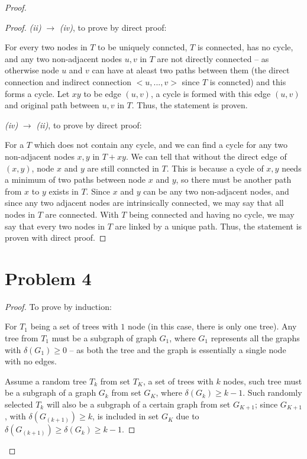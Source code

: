 \documentclass[12pt]{article}
\begin{document}
\begin{proof}
\begin{proof}
\textit{(ii)} $\longrightarrow$ \textit{(iv)}, to prove by direct proof:


For every two nodes in $T$ to be uniquely conncted, $T$ is connected, has no cycle, and any two non-adjacent nodes $u, v$ in $T$ are not directly connected -- as otherwise node $u$ and $v$ can have at aleast two paths between them (the direct connection and indirect connection $<u, ..., v>$ since $T$ is conncted) and this forms a cycle. Let $xy$ to be edge $(u, v)$, a cycle is formed with this edge $(u, v)$ and original path between $u, v$ in $T$. Thus, the statement is proven. \newline


\textit{(iv)} $\longrightarrow$ \textit{(ii)}, to prove by direct proof:

For a $T$ which does not contain any cycle, and we can find a cycle for any two non-adjacent nodes $x, y$ in $T+xy$. We can tell that without the direct edge of $(x,y)$, node $x$ and $y$ are still conncted in $T$. This is because a cycle of $x, y$ needs a minimum of two paths between node $x$ and $y$, so there must be another path from $x$ to $y$ exists in $T$. Since $x$ and $y$ can be any two non-adjacent nodes, and since any two adjacent nodes are intrinsically connected, we may say that all nodes in $T$ are connected. With $T$ being connected and having no cycle, we may say that every two nodes in $T$ are linked by a unique path. Thus, the statement is proven with direct proof.



\end{proof}

\section{Problem 4}


\begin{proof}
To prove by induction: \newline

For $T_1$ being a set of trees with $1$ node (in this case, there is only one tree). Any tree from $T_1$ must be a subgraph of graph $G_1$, where $G_1$ represents all the graphs with $\delta(G_1) \geq 0$ -- as both the tree and the graph is essentially a single node with no edges. \newline

Assume a random tree $T_k$ from set $T_K$, a set of trees with $k$ nodes, such tree must be a subgraph of a graph $G_k$ from set $G_K$, where $\delta(G_k) \geq k - 1$. Such randomly selected $T_k$ will also be a subgraph of a certain graph from set $G_{K+1}$; since $G_{K+1}$, with $\delta(G_(k+1)) \geq k$, is included in set $G_K$ due to $\delta(G_(k+1)) \geq \delta(G_k) \geq k - 1$.\newline


\end{proof}
\end{proof}
\end{document}
